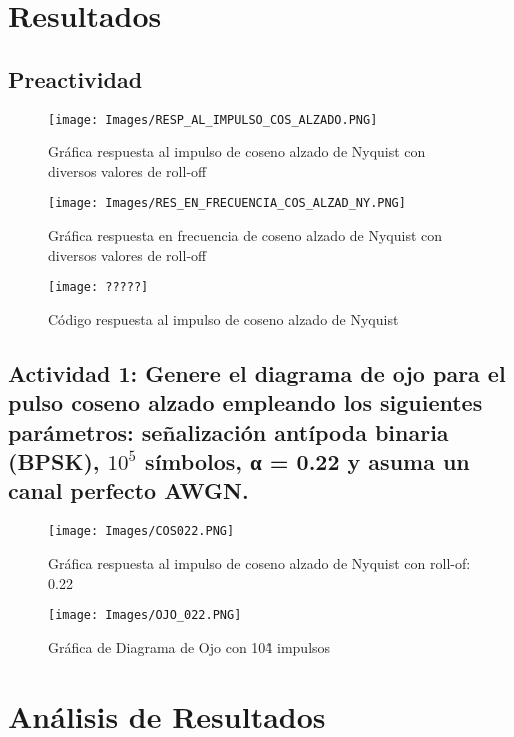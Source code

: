 \documentclass[lettersize,journal]{IEEEtran}
\begin{document}
\section{Resultados}\label{sec:resultados}

\subsection{Preactividad}
\begin{figure}[h!]
    \centering
    \texttt{[image: Images/RESP\_AL\_IMPULSO\_COS\_ALZADO.PNG]}
    \caption{Gráfica respuesta al impulso de coseno alzado de Nyquist con diversos valores de roll-off}
    \label{fig:my_label}
\end{figure}

\begin{figure}[h!]
    \centering
    \texttt{[image: Images/RES\_EN\_FRECUENCIA\_COS\_ALZAD\_NY.PNG]}
    \caption{Gráfica respuesta en frecuencia de coseno alzado de Nyquist con diversos valores de roll-off}
    \label{fig:my_label}
\end{figure}

\newpage


\begin{figure}[h!]
    \centering
    \texttt{[image: ?????]}
    \caption{Código respuesta al impulso de coseno alzado de Nyquist}
    \label{fig:my_label}
\end{figure}



\subsection{Actividad 1: Genere el diagrama de ojo para el pulso coseno alzado empleando los siguientes parámetros: señalización antípoda binaria (BPSK), $10^5$ símbolos, α = 0.22 y
asuma un canal perfecto AWGN.}
\begin{figure}[h!]
    \centering
    \texttt{[image: Images/COS022.PNG]}
    \caption{Gráfica respuesta al impulso de coseno alzado de Nyquist con roll-of: 0.22}
    \label{fig:my_label}
\end{figure}

\begin{figure}[h!]
    \centering
    \texttt{[image: Images/OJO\_022.PNG]}
    \caption{Gráfica de Diagrama de Ojo con 10\^4 impulsos}
    \label{fig:my_label}
\end{figure}
\newpage

\section{Análisis de Resultados}\label{sec:analisis_resultados}
\end{document}
